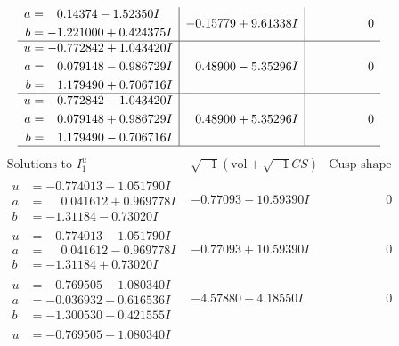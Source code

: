 \documentclass[1p]{elsarticle_modified}
\theoremstyle{definition}
\newcommand{\I}{\sqrt{-1}}
\begin{document}
$$\begin{array}{c|c|c}
\begin{aligned}
a &= \phantom{-}0.14374 - 1.52350 I \\
b &= -1.221000 + 0.424375 I\end{aligned}
 & -0.15779 + 9.61338 I & \phantom{-0.000000 } 0 \\ \hline\begin{aligned}
u &= -0.772842 + 1.043420 I \\
a &= \phantom{-}0.079148 - 0.986729 I \\
b &= \phantom{-}1.179490 + 0.706716 I\end{aligned}
 & \phantom{-}0.48900 - 5.35296 I & \phantom{-0.000000 } 0 \\ \hline\begin{aligned}
u &= -0.772842 - 1.043420 I \\
a &= \phantom{-}0.079148 + 0.986729 I \\
b &= \phantom{-}1.179490 - 0.706716 I\end{aligned}
 & \phantom{-}0.48900 + 5.35296 I & \phantom{-0.000000 } 0\\
 \hline 
 \end{array}$$\newpage$$\begin{array}{c|c|c}  
\text{Solutions to }I^u_{1}& \I (\text{vol} + \sqrt{-1}CS) & \text{Cusp shape}\\
 \hline 
\begin{aligned}
u &= -0.774013 + 1.051790 I \\
a &= \phantom{-}0.041612 + 0.969778 I \\
b &= -1.31184 - 0.73020 I\end{aligned}
 & -0.77093 - 10.59390 I & \phantom{-0.000000 } 0 \\ \hline\begin{aligned}
u &= -0.774013 - 1.051790 I \\
a &= \phantom{-}0.041612 - 0.969778 I \\
b &= -1.31184 + 0.73020 I\end{aligned}
 & -0.77093 + 10.59390 I & \phantom{-0.000000 } 0 \\ \hline\begin{aligned}
u &= -0.769505 + 1.080340 I \\
a &= -0.036932 + 0.616536 I \\
b &= -1.300530 - 0.421555 I\end{aligned}
 & -4.57880 - 4.18550 I & \phantom{-0.000000 } 0 \\ \hline\begin{aligned}
u &= -0.769505 - 1.080340 I \\

\end{aligned}
\end{array}$$
\end{document}
